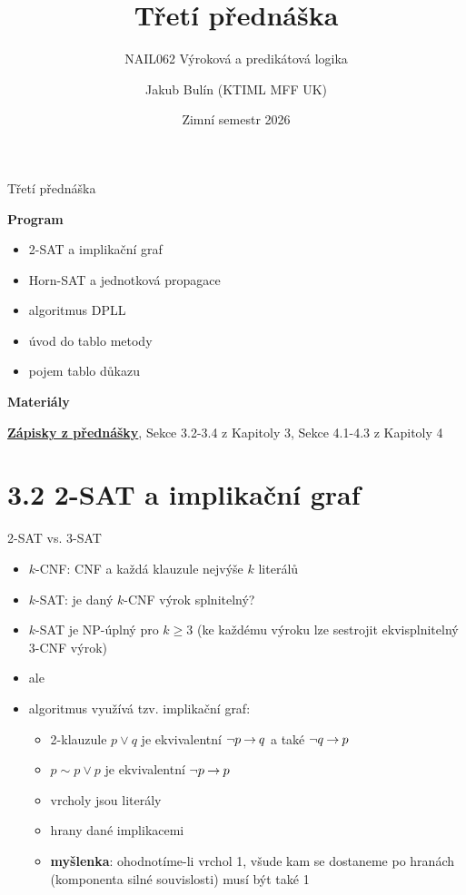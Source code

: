 \documentclass{beamer}
\title{Třetí přednáška}
\subtitle{NAIL062 Výroková a predikátová logika}
\author{Jakub Bulín (KTIML MFF UK)}
\date{Zimní semestr 2026}
\begin{document}
\maketitle


\begin{frame}{Třetí přednáška}

    \textbf{Program}
        \begin{itemize}            
            \item 2-SAT a implikační graf
            \item Horn-SAT a jednotková propagace
            \item algoritmus DPLL
            \item úvod do tablo metody
            \item pojem tablo důkazu
        \end{itemize}

    \textbf{Materiály}

        \href{https://github.com/jbulin-mff-uk/nail062/raw/main/lecture/lecture-notes/lecture-notes.pdf}{\alert{\textbf{Zápisky z přednášky}}}, Sekce 3.2-3.4 z Kapitoly 3, Sekce 4.1-4.3 z Kapitoly 4

\end{frame}


\section{3.2 2-SAT a implikační graf}


\begin{frame}{2-SAT vs. 3-SAT}

    \begin{itemize}[<+->]
        \item \alert{$k$-CNF}: CNF a každá klauzule nejvýše $k$ literálů
        \item \alert{$k$-SAT}: je daný $k$-CNF výrok splnitelný?
        \item $k$-SAT je NP-úplný pro $k\geq 3$ (ke každému výroku lze sestrojit \alert{ekvisplnitelný} 3-CNF výrok)
        \item ale 
        \item algoritmus využívá tzv. \alert{implikační graf}:         
        \begin{itemize}[<+->]
            \item 2-klauzule $p\lor q$ je ekvivalentní $\neg p\mathbin{\rightarrow} q$ a také $\neg q\mathbin{\rightarrow} p$
            \item $p\sim p\lor p$ je ekvivalentní $\neg p\mathbin{\rightarrow} p$
            \item vrcholy jsou literály
            \item hrany dané implikacemi
            \item \textbf{myšlenka}: ohodnotíme-li vrchol 1, všude kam se dostaneme po hranách (\alert{komponenta} silné souvislosti) musí být také 1
        \end{itemize}        
    \end{itemize}    
    
\end{frame}
\end{document}
